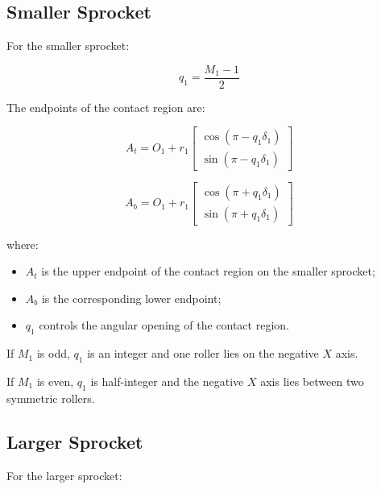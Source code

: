 \documentclass[12pt,a4paper]{article}
\begin{document}
\subsection{Smaller Sprocket}

For the smaller sprocket:

\begin{equation}
q_1=\frac{M_1-1}{2}
\end{equation}

The endpoints of the contact region are:

\begin{equation}
A_t =
O_1+
r_1
\begin{bmatrix}
\cos(\pi-q_1\delta_1)\\
\sin(\pi-q_1\delta_1)
\end{bmatrix}
\end{equation}

\begin{equation}
A_b =
O_1+
r_1
\begin{bmatrix}
\cos(\pi+q_1\delta_1)\\
\sin(\pi+q_1\delta_1)
\end{bmatrix}
\end{equation}

where:

\begin{itemize}
    \item $A_t$ is the upper endpoint of the contact region on the smaller sprocket;
    \item $A_b$ is the corresponding lower endpoint;
    \item $q_1$ controls the angular opening of the contact region.
\end{itemize}

If $M_1$ is odd, $q_1$ is an integer and one roller lies on the negative $X$ axis.

If $M_1$ is even, $q_1$ is half-integer and the negative $X$ axis lies between two symmetric rollers.

\subsection{Larger Sprocket}

For the larger sprocket:
\end{document}
